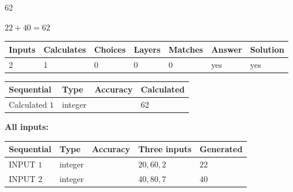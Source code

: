 \documentclass{ctexart}
\begin{document}
 

62
 
 
\noindent{}
 
 

 
 
 
\noindent{}
 
 

$ %
22 +  %
40=   %
62$
 
 
\noindent{}
 
 

 
   
   
   
   
\noindent\begin{tabular}{|l|l|l|l|l|l|l|}
 \hline
Inputs & Calculates & Choices & Layers & Matches & Answer & Solution \\ \hline
 2  & 
 1  & 
 0
  & 
 0  & 
 0  & 
  yes & 
  yes 
  \\ \hline
 \end{tabular}
   
   
   
   
\noindent{}
   
   
  
  
\noindent\begin{tabular}{|l|l|l|l|}
\hline
 Sequential & Type & Accuracy & Calculated \\ 
\hline
 
 
  Calculated $  1 $ & integer &  & 
  $ 62 $ 
 \\  \hline  
 \end{tabular}
   
   
   
   
\noindent\vspace{0.1in}\hspace{-0.08in} {\textbf{\Large{All inputs: }}}
   
   
  
  
\noindent\begin{tabular}{|l|l|l|l|l|}
\hline
 Sequential & Type & Accuracy & Three inputs & Generated \\ 
\hline
 
 
  INPUT $  1 $ & integer &  & $
 20
 , 
 60
 , 
 2
 $ & $ 22 $ 
 \\  \hline  
 
 
  INPUT $  2 $ & integer &  & $
 40
 , 
 80
 , 
 7
 $ & $ 40 $ 
 \\  \hline  
 \end{tabular}
   
\end{document}
